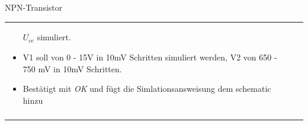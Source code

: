 \begin{frame}[t]{NPN-Transistor}
\begin{spacing}{0.9}
\begin{tiny}
\begin{table}[h!]
\begin{tabular}{p{3cm} p{7cm}}
\begin{minipage}{.7\textwidth}
\begin{itemize}
            $U_{ce}$ simuliert. 
            \item V1 soll von 0 - 15V in 10mV Schritten simuliert werden, V2 von 650 - 750 mV in 10mV Schritten.
            \item Bestätigt mit \textit{OK} und fügt die Simlationsansweisung dem schematic hinzu
          \end{itemize}
          \end{minipage} 
          \\
           & \\
           \hline
        \end{tabular}
      
      \end{table}
      
      \end{tiny} \end{spacing}
      
       \end{frame}



